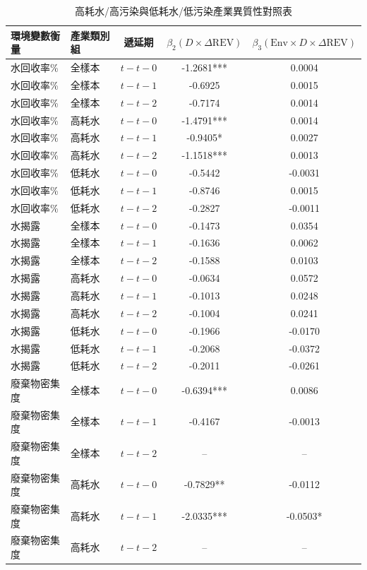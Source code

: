 \documentclass[12pt,a4paper]{article}
\begin{document}
\begin{table}[H]
\centering
\caption{高耗水/高污染與低耗水/低污染產業異質性對照表}
\label{tab:hetero_reg}
\begin{threeparttable}
\small
\begin{tabular}{llccc}
\toprule
環境變數衡量 & 產業類別組 & 遞延期 & $\beta_2 (D \times \Delta\text{REV})$ & $\beta_3 (\text{Env} \times D \times \Delta\text{REV})$ \\
\midrule
水回收率\% & 全樣本 & $t-t-0$ & -1.2681*** & 0.0004 \\
水回收率\% & 全樣本 & $t-t-1$ & -0.6925 & 0.0015 \\
水回收率\% & 全樣本 & $t-t-2$ & -0.7174 & 0.0014 \\
水回收率\% & 高耗水 & $t-t-0$ & -1.4791*** & 0.0014 \\
水回收率\% & 高耗水 & $t-t-1$ & -0.9405* & 0.0027 \\
水回收率\% & 高耗水 & $t-t-2$ & -1.1518*** & 0.0013 \\
水回收率\% & 低耗水 & $t-t-0$ & -0.5442 & -0.0031 \\
水回收率\% & 低耗水 & $t-t-1$ & -0.8746 & 0.0015 \\
水回收率\% & 低耗水 & $t-t-2$ & -0.2827 & -0.0011 \\
水揭露 & 全樣本 & $t-t-0$ & -0.1473 & 0.0354 \\
水揭露 & 全樣本 & $t-t-1$ & -0.1636 & 0.0062 \\
水揭露 & 全樣本 & $t-t-2$ & -0.1588 & 0.0103 \\
水揭露 & 高耗水 & $t-t-0$ & -0.0634 & 0.0572 \\
水揭露 & 高耗水 & $t-t-1$ & -0.1013 & 0.0248 \\
水揭露 & 高耗水 & $t-t-2$ & -0.1004 & 0.0241 \\
水揭露 & 低耗水 & $t-t-0$ & -0.1966 & -0.0170 \\
水揭露 & 低耗水 & $t-t-1$ & -0.2068 & -0.0372 \\
水揭露 & 低耗水 & $t-t-2$ & -0.2011 & -0.0261 \\
廢棄物密集度 & 全樣本 & $t-t-0$ & -0.6394*** & 0.0086 \\
廢棄物密集度 & 全樣本 & $t-t-1$ & -0.4167 & -0.0013 \\
廢棄物密集度 & 全樣本 & $t-t-2$ & -- & -- \\
廢棄物密集度 & 高耗水 & $t-t-0$ & -0.7829** & -0.0112 \\
廢棄物密集度 & 高耗水 & $t-t-1$ & -2.0335*** & -0.0503* \\
廢棄物密集度 & 高耗水 & $t-t-2$ & -- & -- \\

\end{tabular}
\end{threeparttable}
\end{table}
\end{document}
